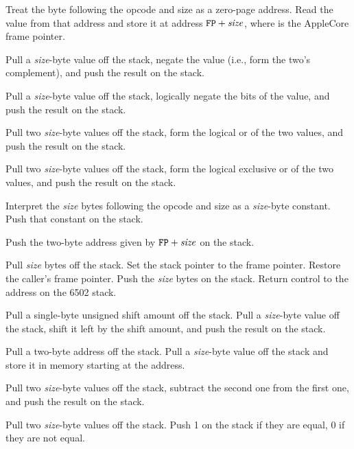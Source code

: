\documentclass[10pt]{article}
\begin{document}
Treat the byte following the opcode and size as a zero-page
address.  Read the value from that address and store it
at address $\texttt{FP}+\mbox{\textit{size}}$, where  is the
AppleCore frame pointer.

 Pull a \emph{size}-byte
value off the stack, negate the value (i.e., form the two's
complement), and push the result on the stack.

 Pull a \emph{size}-byte value
off the stack, logically negate the bits of the value, and push the
result on the stack.

 Pull two
\emph{size}-byte values off the stack, form the logical or of the two
values, and push the result on the stack.

 Pull two
\emph{size}-byte values off the stack, form the logical exclusive or
of the two values, and push the result on the stack.

Interpret the \emph{size} bytes following the opcode and size
as a \emph{size}-byte constant.  Push that constant on the
stack.

Push the two-byte address given by $\texttt{FP}+\mbox{\textit{size}}$ on
the stack.

Pull \emph{size} bytes off the stack.  Set the stack pointer to the
frame pointer.  Restore the caller's frame pointer.  Push the
\emph{size} bytes on the stack.  Return control to the address on the
6502 stack.

 Pull a single-byte
unsigned
shift amount off the stack.  Pull a \emph{size}-byte value off the
stack, shift it left by the shift amount, and push the result on the
stack.

Pull a two-byte address off the stack.  Pull a \emph{size}-byte
value off the stack and store it in memory starting at the
address.

Pull two \emph{size}-byte values off the stack, subtract the
second one from the first one, and push the result on the stack.

Pull two \emph{size}-byte values off the stack. Push 1 on the stack
if they are equal, 0 if they are not equal.
\end{document}
